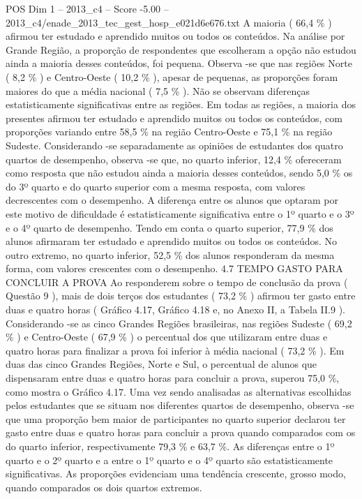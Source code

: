\begin{textsample}{POS Dim 1 – 2013\_c4 – Score -5.00 – 2013\_c4/enade\_2013\_tec\_gest\_hosp\_e021d6e676.txt}
A maioria ( 66,4 \% ) afirmou ter estudado e aprendido muitos ou todos os conteúdos.
Na análise por Grande Região, a proporção de respondentes que escolheram a opção não estudou ainda a maioria desses conteúdos, foi pequena.
Observa -se que nas regiões Norte ( 8,2 \% ) e Centro-Oeste ( 10,2 \% ), apesar de pequenas, as proporções foram maiores do que a média nacional ( 7,5 \% ).
Não se observam diferenças estatisticamente significativas entre as regiões.
Em todas as regiões, a maioria dos presentes afirmou ter estudado e aprendido muitos ou todos os conteúdos, com proporções variando entre 58,5 \% na região Centro-Oeste e 75,1 \% na região Sudeste.
Considerando -se separadamente as opiniões de estudantes dos quatro quartos de desempenho, observa -se que, no quarto inferior, 12,4 \% ofereceram como resposta que não estudou ainda a maioria desses conteúdos, sendo 5,0 \% os do 3º quarto e do quarto superior com a mesma resposta, com valores decrescentes com o desempenho.
A diferença entre os alunos que optaram por este motivo de dificuldade é estatisticamente significativa entre o 1º quarto e o 3º e o 4º quarto de desempenho.
Tendo em conta o quarto superior, 77,9 \% dos alunos afirmaram ter estudado e aprendido muitos ou todos os conteúdos.
No outro extremo, no quarto inferior, 52,5 \% dos alunos responderam da mesma forma, com valores crescentes com o desempenho. 4.7 TEMPO GASTO PARA CONCLUIR A PROVA Ao responderem sobre o tempo de conclusão da prova ( Questão 9 ), mais de dois terços dos estudantes ( 73,2 \% ) afirmou ter gasto entre duas e quatro horas ( Gráfico 4.17, Gráfico 4.18 e, no Anexo II, a Tabela II.9 ).
Considerando -se as cinco Grandes Regiões brasileiras, nas regiões Sudeste ( 69,2 \% ) e Centro-Oeste ( 67,9 \% ) o percentual dos que utilizaram entre duas e quatro horas para finalizar a prova foi inferior à média nacional ( 73,2 \% ).
Em duas das cinco Grandes Regiões, Norte e Sul, o percentual de alunos que dispensaram entre duas e quatro horas para concluir a prova, superou 75,0 \%, como mostra o Gráfico 4.17.
Uma vez sendo analisadas as alternativas escolhidas pelos estudantes que se situam nos diferentes quartos de desempenho, observa -se que uma proporção bem maior de participantes no quarto superior declarou ter gasto entre duas e quatro horas para concluir a prova quando comparados com os do quarto inferior, respectivamente 79,3 \% e 63,7 \%.
As diferenças entre o 1º quarto e o 2º quarto e a entre o 1º quarto e o 4º quarto são estatisticamente significativas.
As proporções evidenciam uma tendência crescente, grosso modo, quando comparados os dois quartos extremos.

\end{textsample}
